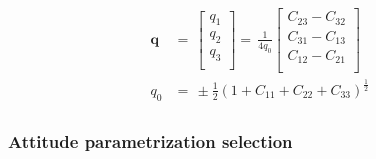 \begin{align}\label{eqn:quat4}
\begin{split}
\bm{q}
& =\,
\begin{bmatrix}
q_1\\[0.3em]
q_2\\[0.3em]
q_3\\[0.3em]
\end{bmatrix}
 =\,
\frac{1}{4q_0}
\begin{bmatrix}
C_{23} - C_{32}\\[0.3em]
C_{31} - C_{13}\\[0.3em]
C_{12} - C_{21}\\[0.3em]
\end{bmatrix}
\\
q_0
& =\,
\pm{\frac{1}{2}}{(1 + C_{11} + C_{22} + C_{33})}^{\frac{1}{2}}
\end{split}
\end{align}

\subsubsection{Attitude parametrization selection}


